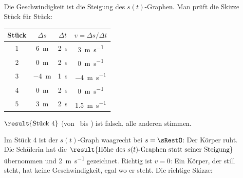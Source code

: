 Die Geschwindigkeit ist die Steigung des $s(t)$-Graphen. Man prüft die Skizze Stück für Stück:
\begin{center}
\begin{tabular}{c|c|c|c}
Stück & $\Delta s$ & $\Delta t$ & $v = \Delta s/\Delta t$ \\
\hline
1 & \SI{6}{\meter} & \SI{2}{\second} & \SI{3}{\meter\per\second} \\
2 & \SI{0}{\meter} & \SI{2}{\second} & \SI{0}{\meter\per\second} \\
3 & \SI{-4}{\meter} & \SI{1}{\second} & \SI{-4}{\meter\per\second} \\
4 & \SI{0}{\meter} & \SI{2}{\second} & \SI{0}{\meter\per\second} \\
5 & \SI{3}{\meter} & \SI{2}{\second} & \SI{1.5}{\meter\per\second}
\end{tabular}
\end{center}
\begin{abcliste}
\abc $\result{\text{Stück 4}}$ (von \tFourO\ bis \tFiveO) ist falsch, alle anderen stimmen.

\abc Im Stück 4 ist der $s(t)$-Graph waagrecht bei $s = \sRestO$: Der Körper ruht. Die Schülerin hat die $\result{\text{Höhe des } s(t)\text{-Graphen statt seiner Steigung}}$ übernommen und \SI{2}{\meter\per\second} gezeichnet. Richtig ist $v = 0$: Ein Körper, der still steht, hat keine Geschwindigkeit, egal wo er steht. Die richtige Skizze:
\begin{center}
\end{center}
\end{abcliste}
